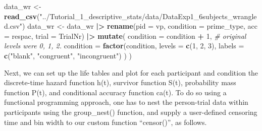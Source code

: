 \documentclass[
  english,
  man, donotrepeattitle,floatsintext]{apa6}
\newenvironment{Shaded}{\begin{snugshade}}{\end{snugshade}}
\newcommand{\AttributeTok}[1]{\textcolor[rgb]{0.13,0.29,0.53}{#1}}
\newcommand{\CommentTok}[1]{\textcolor[rgb]{0.56,0.35,0.01}{\textit{#1}}}
\newcommand{\DecValTok}[1]{\textcolor[rgb]{0.00,0.00,0.81}{#1}}
\newcommand{\FunctionTok}[1]{\textcolor[rgb]{0.13,0.29,0.53}{\textbf{#1}}}
\newcommand{\NormalTok}[1]{#1}
\newcommand{\OtherTok}[1]{\textcolor[rgb]{0.56,0.35,0.01}{#1}}
\newcommand{\SpecialCharTok}[1]{\textcolor[rgb]{0.81,0.36,0.00}{\textbf{#1}}}
\newcommand{\StringTok}[1]{\textcolor[rgb]{0.31,0.60,0.02}{#1}}
\begin{document}
\begin{Shaded}
\begin{Highlighting}[]
\NormalTok{data\_wr }\OtherTok{\textless{}{-}} \FunctionTok{read\_csv}\NormalTok{(}\StringTok{"../Tutorial\_1\_descriptive\_stats/data/DataExp1\_6subjects\_wrangled.csv"}\NormalTok{)}
\NormalTok{data\_wr }\OtherTok{\textless{}{-}}\NormalTok{ data\_wr }\SpecialCharTok{|\textgreater{}}
  \FunctionTok{rename}\NormalTok{(}\AttributeTok{pid =}\NormalTok{ vp, }\AttributeTok{condition =}\NormalTok{ prime\_type, }\AttributeTok{acc =}\NormalTok{ respac, }\AttributeTok{trial =}\NormalTok{ TrialNr) }\SpecialCharTok{|\textgreater{}}
  \FunctionTok{mutate}\NormalTok{(}
    \AttributeTok{condition =}\NormalTok{ condition }\SpecialCharTok{+} \DecValTok{1}\NormalTok{, }\CommentTok{\# original levels were 0, 1, 2.}
    \AttributeTok{condition =} \FunctionTok{factor}\NormalTok{(condition,}
      \AttributeTok{levels =} \FunctionTok{c}\NormalTok{(}\DecValTok{1}\NormalTok{, }\DecValTok{2}\NormalTok{, }\DecValTok{3}\NormalTok{),}
      \AttributeTok{labels =} \FunctionTok{c}\NormalTok{(}\StringTok{"blank"}\NormalTok{, }\StringTok{"congruent"}\NormalTok{, }\StringTok{"incongruent"}\NormalTok{)}
\NormalTok{    )}
\NormalTok{  )}
\end{Highlighting}
\end{Shaded}

\normalsize

Next, we can set up the life tables and plot for each participant and condition the discrete-time hazard function h(t), survivor function S(t), probability mass function P(t), and conditional accuracy function ca(t). To do so using a functional programming approach, one has to nest the person-trial data within participants using the group\_nest() function, and supply a user-defined censoring time and bin width to our custom function ``censor()'', as follows.

\footnotesize
\end{document}

